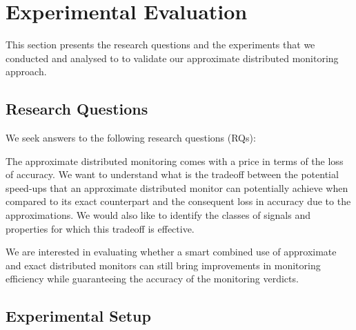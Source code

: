 \section{Experimental Evaluation} \label{sec:experiments}

This section presents the research questions and the experiments that we conducted and analysed to to validate our approximate distributed monitoring approach.

\subsection{Research Questions}

We seek answers to the following research questions (RQs):

\begin{resq}
The  approximate distributed monitoring comes with a price in terms of the loss of accuracy. We want to understand what is the tradeoff between the potential speed-ups that an approximate distributed monitor can potentially achieve when compared to its exact counterpart and the consequent loss in accuracy due to the approximations. We would also like to identify the classes of signals and properties for which this tradeoff is effective. 
\end{resq}

\begin{resq}
We are interested in evaluating whether a smart combined use of approximate and exact distributed monitors can still bring improvements in monitoring efficiency while guaranteeing the accuracy of the monitoring verdicts. 
\end{resq}

\subsection{Experimental Setup}

